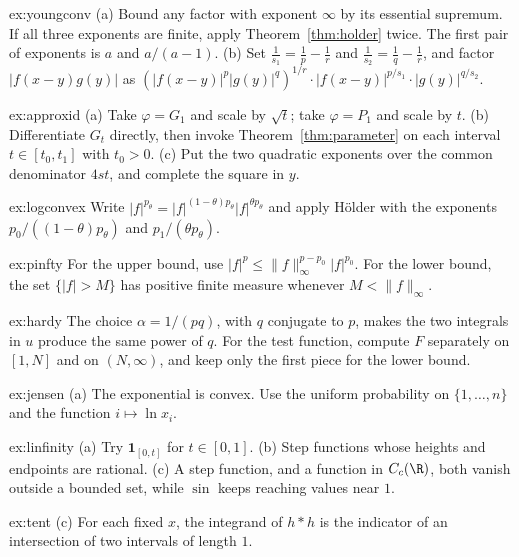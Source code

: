 \begin{hint}{ex:youngconv}
(a) Bound any factor with exponent $\infty$ by its essential supremum. If all three exponents are finite, apply Theorem~\ref{thm:holder} twice. The first pair of exponents is $a$ and $a/(a-1)$. (b) Set $\frac1{s_1}=\frac1p-\frac1r$ and $\frac1{s_2}=\frac1q-\frac1r$, and factor $|f(x-y)g(y)|$ as $(|f(x-y)|^p|g(y)|^q)^{1/r}\cdot|f(x-y)|^{p/s_1}\cdot|g(y)|^{q/s_2}$.
\end{hint}
\begin{hint}{ex:approxid}
(a) Take $\varphi=G_1$ and scale by $\sqrt t$; take $\varphi=P_1$ and scale by $t$. (b) Differentiate $G_t$ directly, then invoke Theorem~\ref{thm:parameter} on each interval $t\in[t_0,t_1]$ with $t_0>0$. (c) Put the two quadratic exponents over the common denominator $4st$, and complete the square in $y$.
\end{hint}
\begin{hint}{ex:logconvex}
Write $|f|^{p_\theta}=|f|^{(1-\theta)p_\theta}|f|^{\theta p_\theta}$ and apply Hölder with the exponents $p_0/((1-\theta)p_\theta)$ and $p_1/(\theta p_\theta)$.
\end{hint}
\begin{hint}{ex:pinfty}
For the upper bound, use $|f|^p\le\|f\|_\infty^{p-p_0}|f|^{p_0}$. For the lower bound, the set $\{|f|>M\}$ has positive finite measure whenever $M<\|f\|_\infty$.
\end{hint}
\begin{hint}{ex:hardy}
The choice $\alpha=1/(pq)$, with $q$ conjugate to $p$, makes the two integrals in $u$ produce the same power of $q$. For the test function, compute $F$ separately on $[1,N]$ and on $(N,\infty)$, and keep only the first piece for the lower bound.
\end{hint}
\begin{hint}{ex:jensen}
(a) The exponential is convex. Use the uniform probability on $\{1,\dots,n\}$ and the function $i\mapsto\ln x_i$.
\end{hint}
\begin{hint}{ex:linfinity}
(a) Try $\mathbf 1_{[0,t]}$ for $t\in[0,1]$. (b) Step functions whose heights and endpoints are rational. (c) A step function, and a function in $C_c(\R)$, both vanish outside a bounded set, while $\sin$ keeps reaching values near $1$.
\end{hint}
\begin{hint}{ex:tent}
(c) For each fixed $x$, the integrand of $h*h$ is the indicator of an intersection of two intervals of length $1$.
\end{hint}
